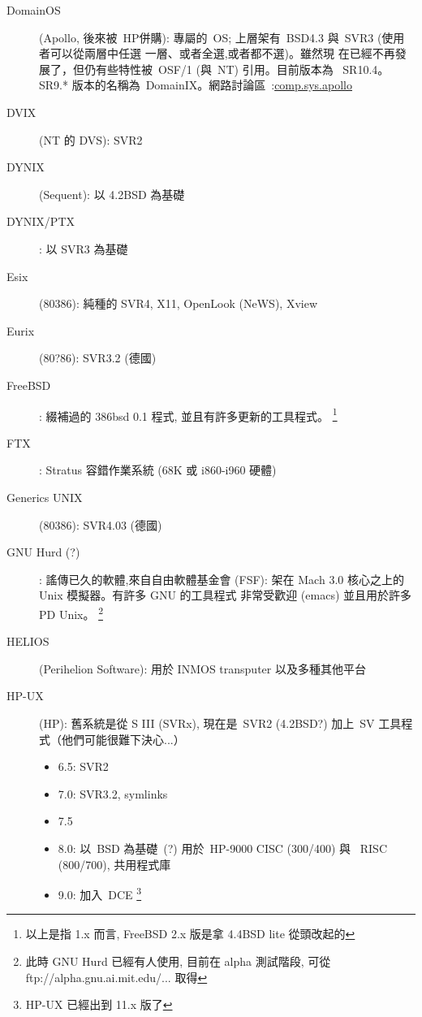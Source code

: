 \documentclass{article}
\begin{document}
\begin{CJK*}{Bg5}{ming}
{\begin{description}
      \item [DomainOS] (Apollo, 後來被~HP併購): 專屬的~OS; 
	上層架有~BSD4.3 與~SVR3 (使用者可以從兩層中任選
	一層、或者全選,或者都不選)。雖然現
      在已經不再發展了，但仍有些特性被~OSF/1 (與~NT) 引用。目前版本為
      ~SR10.4。SR9.* 版本的名稱為~DomainIX。網路討論區~:\url{comp.sys.apollo}

      \item [DVIX] (NT 的 DVS):  SVR2

      \item [DYNIX] (Sequent): 以 4.2BSD 為基礎

      \item [DYNIX/PTX]: 以 SVR3 為基礎

      \item [Esix] (80386):  純種的 SVR4, X11, OpenLook (NeWS), Xview

      \item [Eurix] (80?86):  SVR3.2 (德國)

      \item [FreeBSD]: 綴補過的 386bsd 0.1 程式, 並且有許多更新的工具程式。
      \footnote{以上是指 1.x 而言, FreeBSD 2.x 版是拿 4.4BSD lite 從頭改起的}

      \item [FTX]: Stratus 容錯作業系統 (68K 或 i860-i960 硬體)

      \item [Generics UNIX] (80386): SVR4.03 (德國)

      \item [GNU Hurd (?)]: 謠傳已久的軟體,來自自由軟體基金會 (FSF):
         架在 Mach 3.0 核心之上的 Unix 模擬器。有許多 GNU 的工具程式
         非常受歡迎 (emacs) 並且用於許多 PD Unix。
         \footnote{此時 GNU Hurd 已經有人使用, 目前在 alpha 測試階段,
                 可從 ftp://alpha.gnu.ai.mit.edu/... 取得}

      \item [HELIOS] (Perihelion Software): 用於 INMOS transputer 以及多種其他平台

      \item [HP-UX] (HP):  舊系統是從 S III (SVRx), 現在是~SVR2 (4.2BSD?) 加上~SV
         工具程式（他們可能很難下決心...）
\begin{itemize}
         \item 6.5: SVR2
         \item 7.0: SVR3.2, symlinks
         \item 7.5
         \item 8.0: 以~BSD 為基礎~(?) 用於~HP-9000 CISC (300/400) 與
		~RISC (800/700), 共用程式庫
         \item 9.0: 加入~DCE
         \footnote{HP-UX 已經出到 11.x 版了}
\end{itemize}


\end{description}}
\end{CJK*}
\end{document}
